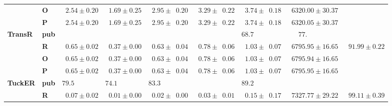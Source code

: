 \begin{tabular}{llrrrrrrr}
       & \textbf{O} &  $\phantom{0}2.54 \pm 0.20$ &  $\phantom{0}1.69 \pm 0.25$ &  $\phantom{0}2.95 \pm \phantom{0}0.20$ &  $\phantom{0}3.29 \pm \phantom{0}0.22$ &  $\phantom{0}3.74 \pm \phantom{0}0.18$ &            $\phantom{0}6320.00 \pm 30.37$ &                              \\
       & \textbf{P} &  $\phantom{0}2.54 \pm 0.20$ &  $\phantom{0}1.69 \pm 0.25$ &  $\phantom{0}2.95 \pm \phantom{0}0.20$ &  $\phantom{0}3.29 \pm \phantom{0}0.22$ &  $\phantom{0}3.74 \pm \phantom{0}0.18$ &            $\phantom{0}6320.05 \pm 30.37$ &                              \\\midrule
\textbf{TransR} & \textbf{pub} &                             &                             &                                        &                                        &            $68.7\phantom{0 \pm 00.00}$ &  $\phantom{000}77.\phantom{00 \pm 00.00}$ &                              \\
       & \textbf{R} &  $\phantom{0}0.65 \pm 0.02$ &  $\phantom{0}0.37 \pm 0.00$ &  $\phantom{0}0.63 \pm \phantom{0}0.04$ &  $\phantom{0}0.78 \pm \phantom{0}0.06$ &  $\phantom{0}1.03 \pm \phantom{0}0.07$ &            $\phantom{0}6795.95 \pm 16.65$ &  $\phantom{0}91.99 \pm 0.22$ \\
       & \textbf{O} &  $\phantom{0}0.65 \pm 0.02$ &  $\phantom{0}0.37 \pm 0.00$ &  $\phantom{0}0.63 \pm \phantom{0}0.04$ &  $\phantom{0}0.78 \pm \phantom{0}0.06$ &  $\phantom{0}1.03 \pm \phantom{0}0.07$ &            $\phantom{0}6795.94 \pm 16.65$ &                              \\
       & \textbf{P} &  $\phantom{0}0.65 \pm 0.02$ &  $\phantom{0}0.37 \pm 0.00$ &  $\phantom{0}0.63 \pm \phantom{0}0.04$ &  $\phantom{0}0.78 \pm \phantom{0}0.06$ &  $\phantom{0}1.03 \pm \phantom{0}0.07$ &            $\phantom{0}6795.95 \pm 16.65$ &                              \\\midrule
\textbf{TuckER} & \textbf{pub} &  $79.5\phantom{0 \pm 0.00}$ &  $74.1\phantom{0 \pm 0.00}$ &            $83.3\phantom{0 \pm 00.00}$ &                                        &            $89.2\phantom{0 \pm 00.00}$ &                                           &                              \\
       & \textbf{R} &  $\phantom{0}0.07 \pm 0.02$ &  $\phantom{0}0.01 \pm 0.00$ &  $\phantom{0}0.02 \pm \phantom{0}0.00$ &  $\phantom{0}0.03 \pm \phantom{0}0.01$ &  $\phantom{0}0.15 \pm \phantom{0}0.17$ &            $\phantom{0}7327.77 \pm 29.22$ &  $\phantom{0}99.11 \pm 0.39$ \\
\bottomrule
\end{tabular}

